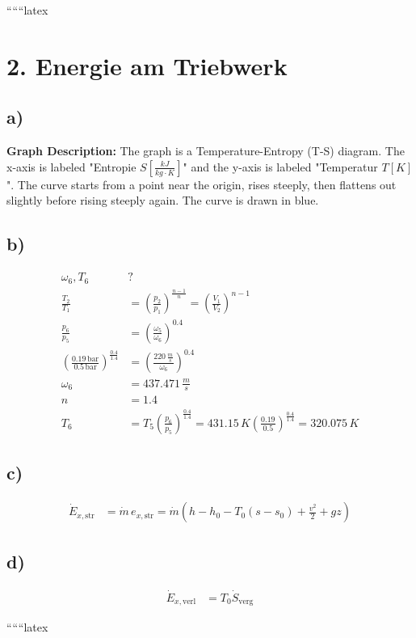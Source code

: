 
``````latex


\section*{2. Energie am Triebwerk}

\subsection*{a)}
\begin{center}
\textbf{Graph Description:} The graph is a Temperature-Entropy (T-S) diagram. The x-axis is labeled "Entropie $S \left[ \frac{kJ}{kg \cdot K} \right]$" and the y-axis is labeled "Temperatur $T \left[ K \right]$". The curve starts from a point near the origin, rises steeply, then flattens out slightly before rising steeply again. The curve is drawn in blue.
\end{center}

\subsection*{b)}
\begin{align*}
\omega_6, T_6 &? \\
\frac{T_2}{T_1} &= \left( \frac{p_2}{p_1} \right)^{\frac{n-1}{n}} = \left( \frac{V_1}{V_2} \right)^{n-1} \\
\frac{p_6}{p_5} &= \left( \frac{\omega_5}{\omega_6} \right)^{0.4} \\
\left( \frac{0.19 \, \text{bar}}{0.5 \, \text{bar}} \right)^{\frac{0.4}{1.4}} &= \left( \frac{220 \, \frac{m}{s}}{\omega_6} \right)^{0.4} \\
\omega_6 &= 437.471 \, \frac{m}{s} \\
n &= 1.4 \\
T_6 &= T_5 \left( \frac{p_6}{p_5} \right)^{\frac{0.4}{1.4}} = 431.15 \, K \left( \frac{0.19}{0.5} \right)^{\frac{0.4}{1.4}} = 320.075 \, K
\end{align*}

\subsection*{c)}
\begin{align*}
\dot{E}_{x, \text{str}} &= \dot{m} \, e_{x, \text{str}} = \dot{m} \left( h - h_0 - T_0 (s - s_0) + \frac{v^2}{2} + gz \right)
\end{align*}

\subsection*{d)}
\begin{align*}
\dot{E}_{x, \text{verl}} &= T_0 \dot{S}_{\text{verg}}
\end{align*}

``````latex


